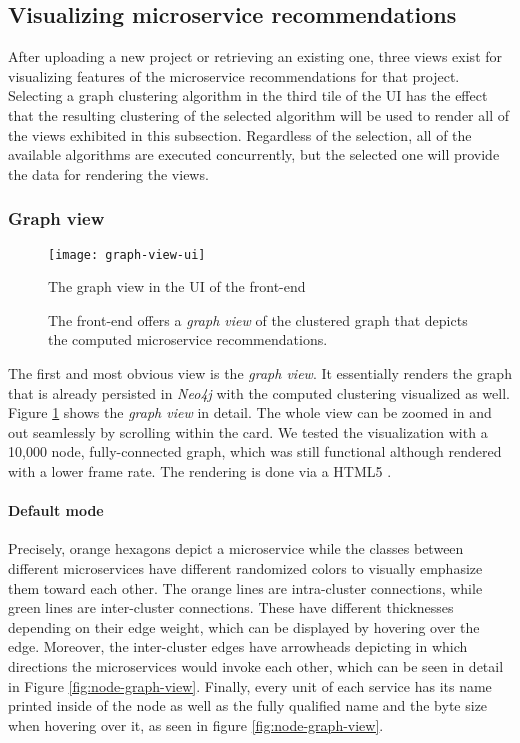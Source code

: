 \documentclass[12pt,a4paper]{report}
\begin{document}
\subsection{Visualizing microservice recommendations}

After uploading a new project or retrieving an existing one, three views exist
for visualizing features of the microservice recommendations for that project.
Selecting a graph clustering algorithm in the third tile of the UI has the
effect that the resulting clustering of the selected algorithm will be used to
render all of the views exhibited in this subsection. Regardless of the
selection, all of the available algorithms are executed concurrently, but the
selected one will provide the data for rendering the views.


\subsubsection{Graph view}
\begin{figure}[htbp]
\centering
\texttt{[image: graph-view-ui]}
\caption{The graph view in the UI of the front-end}
\caption*{\centering
  The front-end offers a \textit{graph view} of the clustered graph that depicts
  the computed microservice recommendations.
}
\label{fig:graph-view-ui}
\end{figure}

The first and most obvious view is the \textit{graph view}. It essentially
renders the graph that is already persisted in \textit{Neo4j} with the computed
clustering visualized as well. Figure \ref{fig:graph-view-ui} shows the
\textit{graph view} in detail. The whole view can be zoomed in and out seamlessly
by scrolling within the card. We tested the visualization with a 10,000 node,
fully-connected graph, which was still functional although rendered with a
lower frame rate. The rendering is done via a HTML5 .

\paragraph{Default mode}
Precisely, orange hexagons depict a microservice while
the classes between different microservices have different randomized colors to
visually emphasize them toward each other. The orange lines are intra-cluster
connections, while green lines are inter-cluster connections. These have
different thicknesses depending on their edge weight, which can be displayed by
hovering over the edge. Moreover, the inter-cluster edges have arrowheads
depicting in which directions the microservices would invoke each other, which
can be seen in detail in Figure \ref{fig:node-graph-view}. Finally, every unit
of each service has its name printed inside of the node as well as the fully
qualified name and the byte size when hovering over it, as seen in figure
\ref{fig:node-graph-view}.
\end{document}
